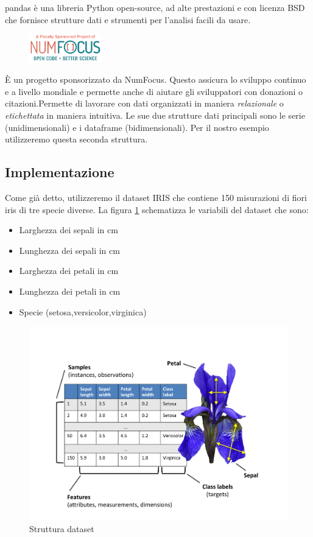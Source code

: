 \documentclass[12pt]{article}
\begin{document}
		pandas è una libreria Python open-source, ad alte prestazioni e con licenza BSD che fornisce strutture dati e strumenti per l'analisi facili da usare.
		\begin{figure} %
			\begin{center}
				\includegraphics[width=0.28\textwidth]{numFocus.png}
			\end{center}
		\end{figure}
		\`{E} un progetto sponsorizzato da NumFocus. Questo assicura lo sviluppo continuo e a livello mondiale e permette anche di aiutare gli sviluppatori con donazioni o citazioni.Permette di lavorare con dati organizzati in maniera \emph{relazionale} o \emph{etichettata} in maniera intuitiva. Le sue due strutture dati principali sono le serie (unidimensionali) e i dataframe (bidimensionali). Per il nostro esempio utilizzeremo questa seconda struttura.
		

	\subsection{Implementazione}
	
		Come già detto, utilizzeremo il dataset IRIS che contiene 150 misurazioni di fiori iris di tre specie diverse. La figura \ref{fig:iris} schematizza le variabili del dataset che sono:
		\begin{itemize}
			\item Larghezza dei sepali in cm
			\item Lunghezza dei sepali in cm
			\item Larghezza dei petali in cm
			\item Lunghezza dei petali in cm
			\item Specie (setosa,versicolor,virginica)
		\end{itemize}
		\begin{figure}
			\begin{center}
				\includegraphics[scale=.1]{iris}
				\caption{Struttura dataset}
				\label{fig:iris}
			\end{center}
		\end{figure}
\end{document}

